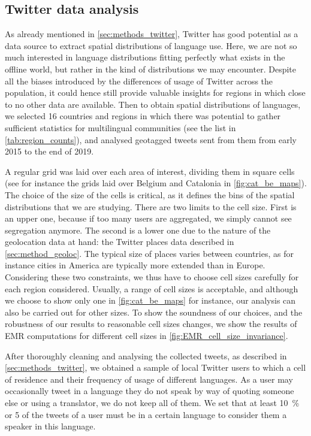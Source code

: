 \documentclass[../thesis.tex]{subfiles}
\begin{document}
\subsection{Twitter data analysis}
As already mentioned in \cref{sec:methods_twitter}, Twitter has good potential as a data
source to extract spatial distributions of language use. Here, we are not so much
interested in language distributions fitting perfectly what exists in the offline world,
but rather in the kind of distributions we may encounter. Despite all the biases
introduced by the differences of usage of Twitter across the population, it could hence
still provide valuable insights for regions in which close to no other data are
available. Then to obtain spatial distributions of languages, we selected 16 countries
and regions in which there was potential to gather sufficient statistics for
multilingual communities (see the list in \cref{tab:region_counts}), and analysed
geotagged tweets sent from them from early 2015 to the end of 2019.

A regular grid was laid over each area of interest, dividing them in square cells (see
for instance the grids laid over Belgium and Catalonia in \cref{fig:cat_be_maps}). The
choice of the size of the cells is critical, as it defines the bins of the spatial
distributions that we are studying. There are two limits to the cell size. First is an
upper one, because if too many users are aggregated, we simply cannot see segregation
anymore. The second is a lower one due to the nature of the geolocation data at hand:
the Twitter places data described in \cref{sec:method_geoloc}. The typical size of
places varies between countries, as for instance cities in America are typically more
extended than in Europe. Considering these two constraints, we thus have to choose cell
sizes carefully for each region considered. Usually, a range of cell sizes is
acceptable, and although we choose to show only one in \cref{fig:cat_be_maps} for
instance, our analysis can also be carried out for other sizes. To show the soundness of
our choices, and the robustness of our results to reasonable cell sizes changes, we show
the results of \ac{EMR} computations for different cell sizes in
\cref{fig:EMR_cell_size_invariance}.

After thoroughly cleaning and analysing the collected tweets, as described in
\cref{sec:methods_twitter}, we obtained a sample of local Twitter users to which a cell
of residence and their frequency of usage of different languages. As a user may
occasionally tweet in a language they do not speak by way of quoting someone else or
using a translator, we do not keep all of them. We set that at least \SI{10}{\percent}
or 5 of the tweets of a user must be in a certain language to consider them a speaker in
this language. 
\end{document}
